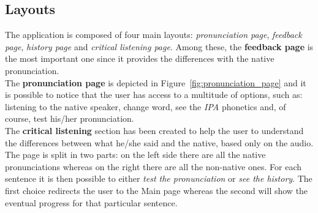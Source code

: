 \subsection{Layouts}
\label{ssec:layouts}
The application is composed of four main layouts: \textit{pronunciation page}, \textit{feedback page}, \textit{history page} and \textit{critical listening page}. Among these, the \textbf{feedback page} is the most important one since it provides the differences with the native pronunciation. \\

\noindent The \textbf{pronunciation page} is depicted in Figure~\ref{fig:pronunciation_page} and it is possible to notice that the user has access to a multitude of options, such as: listening to the native speaker, change word, see the \textit{IPA} phonetics and, of course, test his/her pronunciation. \\

\noindent The \textbf{critical listening} section has been created to help the user to understand the differences between what he/she said and the native, based only on the audio. The page is split in two parts: on the left side there are all the native pronunciations whereas on the right there are all the non-native ones. For each sentence it is then possible to either \textit{test the pronunciation} or \textit{see the history}. The first choice redirects the user to the Main page whereas the second will show the eventual progress for that particular sentence. \\

